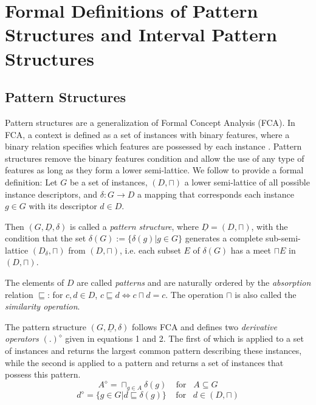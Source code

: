 \documentclass[
]{ceurart}
\begin{document}
\section{Formal Definitions of Pattern Structures and Interval
Pattern Structures}
\subsection{Pattern Structures}
Pattern structures are a generalization of Formal Concept Analysis (FCA). In FCA, a context is defined as a set of instances with binary features, where a binary relation specifies which features are possessed by each instance \cite{ganter2012formal}. Pattern structures remove the binary features condition and allow the use of any type of features as long as they form a lower semi-lattice. We follow \cite{ganter2001pattern} to provide a formal definition:
Let $G$ be a set of instances, $(D, \sqcap)$ a lower semi-lattice of all possible instance descriptors, and $\delta:G \rightarrow D$ a mapping that corresponds each instance $g \in G$ with its descriptor $d \in D$. 

Then $(G, \underline{D}, \delta)$ is called a \textit{pattern structure}, where $\underline{D}=(D, \sqcap)$, with the condition that the set $\delta(G):=\{ \delta(g)|g\in G\}$ generates a complete sub-semi-lattice $(D_\delta , \sqcap)$ from $(D, \sqcap)$, i.e. each subset $E$ of $\delta(G)$ has a meet $\sqcap E$ in $(D, \sqcap)$. 

The elements of $D$ are called \textit{patterns} and are naturally ordered by the \textit{absorption} relation $\sqsubseteq$: for $c, d \in D$,  $c \sqsubseteq d \iff c \sqcap d = c$. The operation $\sqcap$ is also called the \textit{similarity operation}.

The pattern structure $(G, \underline{D}, \delta)$ follows FCA and defines two \textit{derivative operators} $(.)^\diamond$ given in equations 1 and 2. The first of which is applied to a set of instances and returns the largest common pattern describing these instances, while the second is applied to a pattern and returns a set of instances that possess this pattern.
\begin{equation}
    A^\diamond = \sqcap_{g\in A}\delta(g) \;\;\;\; \text{for} \;\;\;A \subseteq G 
\end{equation}
\begin{equation}
    d^\diamond = \{ g\in G | d \sqsubseteq \delta(g) \} \;\;\;\; \text{for} \;\;\; d \in (D, \sqcap)
\end{equation}
\end{document}
